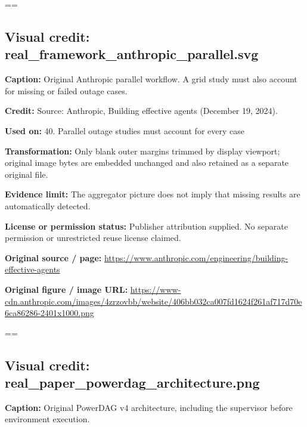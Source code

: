 \documentclass[10pt,letterpaper]{article}
\begin{document}
\setbox\readingEntry=\vbox\bgroup\hsize=\linewidth\subsection*{Visual credit: real\_framework\_anthropic\_parallel.svg}
\textbf{Caption:} Original Anthropic parallel workflow. A grid study must also account for missing or failed outage cases.\par
\textbf{Credit:} Source: Anthropic, Building effective agents (December 19, 2024).\par
\textbf{Used on:} 40. Parallel outage studies must account for every case\par
\textbf{Transformation:} Only blank outer margins trimmed by display viewport; original image bytes are embedded unchanged and also retained as a separate original file.\par
\textbf{Evidence limit:} The aggregator picture does not imply that missing results are automatically detected.\par
\textbf{License or permission status:} Publisher attribution supplied. No separate permission or unrestricted reuse license claimed.\par
\textbf{Original source / page:} \href{https://www.anthropic.com/engineering/building-effective-agents}{\small\ttfamily https:/\allowbreak{}/\allowbreak{}www.\allowbreak{}anthropic.\allowbreak{}com/\allowbreak{}engineering/\allowbreak{}building-\allowbreak{}effective-\allowbreak{}agents}\par
\textbf{Original figure / image URL:} \href{https://www-cdn.anthropic.com/images/4zrzovbb/website/406bb032ca007fd1624f261af717d70e6ca86286-2401x1000.png}{\small\ttfamily https:/\allowbreak{}/\allowbreak{}www-\allowbreak{}cdn.\allowbreak{}anthropic.\allowbreak{}com/\allowbreak{}images/\allowbreak{}4zrzovbb/\allowbreak{}website/\allowbreak{}406bb032ca007fd1624f261af717d70e6ca86286-\allowbreak{}2401x1000.\allowbreak{}png}\par
\egroup\par\noindent\box\readingEntry\par\medskip
\setbox\readingEntry=\vbox\bgroup\hsize=\linewidth\subsection*{Visual credit: real\_paper\_powerdag\_architecture.png}
\textbf{Caption:} Original PowerDAG v4 architecture, including the supervisor before environment execution.\par
\end{document}

